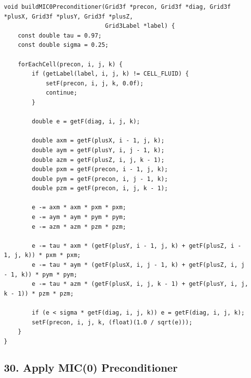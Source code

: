 \documentclass[10pt,letterpaper]{article}
\begin{document}
\begin{verbatim}
void buildMIC0Preconditioner(Grid3f *precon, Grid3f *diag, Grid3f *plusX, Grid3f *plusY, Grid3f *plusZ,
                             Grid3Label *label) {
    const double tau = 0.97;
    const double sigma = 0.25;

    forEachCell(precon, i, j, k) {
        if (getLabel(label, i, j, k) != CELL_FLUID) {
            setF(precon, i, j, k, 0.0f);
            continue;
        }

        double e = getF(diag, i, j, k);

        double axm = getF(plusX, i - 1, j, k);
        double aym = getF(plusY, i, j - 1, k);
        double azm = getF(plusZ, i, j, k - 1);
        double pxm = getF(precon, i - 1, j, k);
        double pym = getF(precon, i, j - 1, k);
        double pzm = getF(precon, i, j, k - 1);

        e -= axm * axm * pxm * pxm;
        e -= aym * aym * pym * pym;
        e -= azm * azm * pzm * pzm;

        e -= tau * axm * (getF(plusY, i - 1, j, k) + getF(plusZ, i - 1, j, k)) * pxm * pxm;
        e -= tau * aym * (getF(plusX, i, j - 1, k) + getF(plusZ, i, j - 1, k)) * pym * pym;
        e -= tau * azm * (getF(plusX, i, j, k - 1) + getF(plusY, i, j, k - 1)) * pzm * pzm;

        if (e < sigma * getF(diag, i, j, k)) e = getF(diag, i, j, k);
        setF(precon, i, j, k, (float)(1.0 / sqrt(e)));
    }
}
\end{verbatim}

\subsection*{30. Apply MIC(0) Preconditioner}
\end{document}
